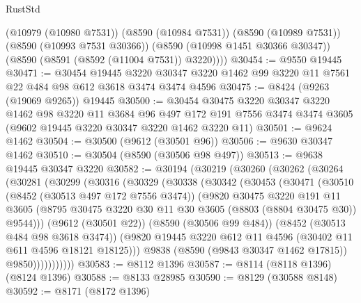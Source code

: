 \begin{lexlean}{RustStd}
\begin{coremodule}
        (@10979 (@10980 @7531))
        (@8590 (@10984 @7531))
        (@8590 (@10989 @7531))
        (@8590 (@10993 @7531 @30366))
        (@8590 (@10998 @1451 @30366 @30347))
        (@8590 (@8591 (@8592 (@11004 @7531)) @3220))))
@30454 := @9550 @19445
@30471 := @30454
    @19445
    @3220
    @30347
    @3220
    @1462
    @99
    @3220
    @11
    @7561
    @22
    @484
    @98
    @612
    @3618
    @3474
    @3474
    @4596
@30475 := @8424 (@9263 (@19069 @9265)) @19445
@30500 := @30454
    @30475
    @3220
    @30347
    @3220
    @1462
    @98
    @3220
    @11
    @3684
    @96
    @497
    @172
    @191
    @7556
    @3474
    @3474
    @3605
    (@9602 @19445 @3220 @30347 @3220 @1462 @3220 @11)
@30501 := @9624 @1462
@30504 := @30500 (@9612 (@30501 @96))
@30506 := @9630 @30347 @1462
@30510 := @30504 (@8590 (@30506 @98 @497))
@30513 := @9638 @19445 @30347 @3220
@30582 := @30194
    (@30219
      (@30260
        (@30262
          (@30264
            (@30281
              (@30299
                (@30316
                  (@30329
                    (@30338
                      (@30342
                        (@30453
                          (@30471
                            (@30510
                              (@8452 (@30513 @497 @172 @7556 @3474))
                              (@9820
                                @30475
                                @3220
                                @191
                                @11
                                @3605
                                (@8795
                                  @30475
                                  @3220
                                  @30
                                  @11
                                  @30
                                  @3605
                                  (@8803 (@8804 @30475 @30))
                                  @9544)))
                            (@9612 (@30501 @22))
                            (@8590 (@30506 @99 @484))
                            (@8452 (@30513 @484 @98 @3618 @3474))
                            (@9820
                              @19445
                              @3220
                              @612
                              @11
                              @4596
                              (@30402 @11 @611 @4596 @18121 @18125)))
                          @9838
                          (@8590 (@9843 @30347 @1462 @17815))
                          @9850)))))))))))
@30583 := @8112 @1396
@30587 := @8114 (@8118 @1396) (@8124 @1396)
@30588 := @8133 @28985
@30590 := @8129 (@30588 @8148)
@30592 := @8171 (@8172 @1396)

\end{coremodule}
\end{lexlean}
